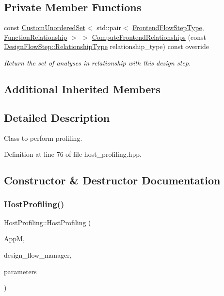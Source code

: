 \subsection*{Private Member Functions}
\begin{DoxyCompactItemize}
\item 
const \hyperlink{classCustomUnorderedSet}{Custom\+Unordered\+Set}$<$ std\+::pair$<$ \hyperlink{frontend__flow__step_8hpp_afeb3716c693d2b2e4ed3e6d04c3b63bb}{Frontend\+Flow\+Step\+Type}, \hyperlink{classFrontendFlowStep_af7cf30f2023e5b99e637dc2058289ab0}{Function\+Relationship} $>$ $>$ \hyperlink{classHostProfiling_a79248ec2de929f59b88137e34837b869}{Compute\+Frontend\+Relationships} (const \hyperlink{classDesignFlowStep_a723a3baf19ff2ceb77bc13e099d0b1b7}{Design\+Flow\+Step\+::\+Relationship\+Type} relationship\+\_\+type) const override
\begin{DoxyCompactList}\small\item\em Return the set of analyses in relationship with this design step. \end{DoxyCompactList}\end{DoxyCompactItemize}
\subsection*{Additional Inherited Members}


\subsection{Detailed Description}
Class to perform profiling. 

Definition at line 76 of file host\+\_\+profiling.\+hpp.



\subsection{Constructor \& Destructor Documentation}
\mbox{\label{classHostProfiling_a20f6b7dda2087eb8b6970420ac4447eb}} 
\subsubsection{\texorpdfstring{Host\+Profiling()}{HostProfiling()}}
{\footnotesize\ttfamily Host\+Profiling\+::\+Host\+Profiling (\begin{DoxyParamCaption}\item[{const \hyperlink{application__manager_8hpp_a04ccad4e5ee401e8934306672082c180}{application\+\_\+manager\+Ref}}]{AppM,  }\item[{const Design\+Flow\+Manager\+Const\+Ref}]{design\+\_\+flow\+\_\+manager,  }\item[{const \hyperlink{Parameter_8hpp_a37841774a6fcb479b597fdf8955eb4ea}{Parameter\+Const\+Ref}}]{parameters }\end{DoxyParamCaption})}



